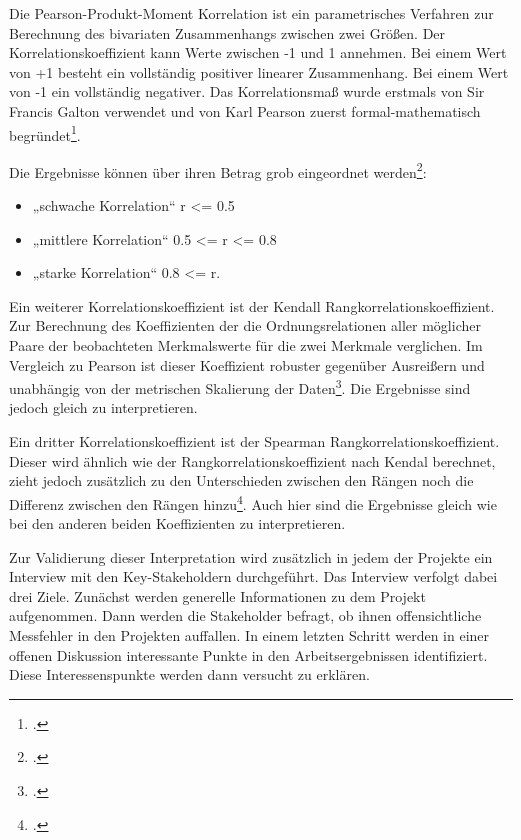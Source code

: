 Die Pearson-Produkt-Moment Korrelation ist ein parametrisches Verfahren
zur Berechnung des bivariaten Zusammenhangs zwischen zwei Größen. Der
Korrelationskoeffizient kann Werte zwischen -1 und 1 annehmen. Bei einem
Wert von +1 besteht ein vollständig positiver linearer Zusammenhang. Bei
einem Wert von -1 ein vollständig negativer. Das Korrelationsmaß wurde
erstmals von Sir Francis Galton verwendet und von Karl Pearson zuerst
formal-mathematisch begründet\footcite[Vgl. ][]{brucklerGeschichteMathematikKompakt2018
S. 116}.

Die Ergebnisse können über ihren Betrag grob eingeordnet
werden\footcite[Vgl. ][]{fahrmeirStatistikWegZur2016 S. 130}:

\begin{itemize}
\item
    „schwache Korrelation`` r <= 0.5
\item
    „mittlere Korrelation`` 0.5 <= r <= 0.8
\item
    „starke Korrelation`` 0.8 <= r.
\end{itemize}

Ein weiterer Korrelationskoeffizient ist der Kendall
Rangkorrelationskoeffizient. Zur Berechnung des Koeffizienten der die
Ordnungsrelationen aller möglicher Paare der beobachteten Merkmalswerte
für die zwei Merkmale verglichen. Im Vergleich zu Pearson ist dieser
Koeffizient robuster gegenüber Ausreißern und unabhängig von der
metrischen Skalierung der Daten\footcite[Vgl. ][]{fahrmeirStatistikWegZur2016 S.
  137ff}. Die Ergebnisse sind jedoch gleich zu interpretieren.

Ein dritter Korrelationskoeffizient ist der Spearman
Rangkorrelationskoeffizient. Dieser wird ähnlich wie der
Rangkorrelationskoeffizient nach Kendal berechnet, zieht jedoch
zusätzlich zu den Unterschieden zwischen den Rängen noch die Differenz
zwischen den Rängen hinzu\footcite[Vgl. ][]{fahrmeirStatistikWegZur2016 S. 133f}.
Auch hier sind die Ergebnisse gleich wie bei den anderen beiden
Koeffizienten zu interpretieren.

Zur Validierung dieser Interpretation wird zusätzlich in jedem der
Projekte ein Interview mit den Key-Stakeholdern durchgeführt. Das
Interview verfolgt dabei drei Ziele. Zunächst werden generelle
Informationen zu dem Projekt aufgenommen. Dann werden die Stakeholder
befragt, ob ihnen offensichtliche Messfehler in den Projekten auffallen.
In einem letzten Schritt werden in einer offenen Diskussion interessante
Punkte in den Arbeitsergebnissen identifiziert. Diese Interessenspunkte
werden dann versucht zu erklären.

